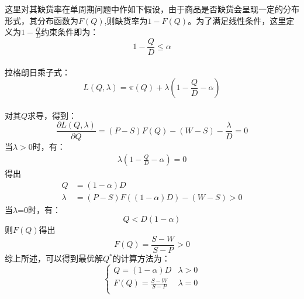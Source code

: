 \documentclass[12pt,a4paper]{article}
\begin{document}
这里对其缺货率在单周期问题中作如下假设，由于商品是否缺货会呈现一定的分布形式，其分布函数为$F\left(Q\right)$,则缺货率为$1-F\left(Q\right)$。为了满足线性条件，这里定义为$1-\frac{Q}{D} $约束条件即为：
\begin{equation}
  1-\frac{Q}{D}\leq \alpha
\end{equation} \\
拉格朗日乘子式：
\begin{equation}
    L\left( Q,\lambda  \right) =\pi \left( Q \right) +\lambda \left( 1-\frac{Q}{D}-\alpha \right)
\end{equation} \\
对其$Q$求导，得到：
\begin{equation}
    \frac{\partial L\left( Q,\lambda  \right)}{\partial Q} =\left( P-S \right) F(Q) -\left( W-S \right) -\frac{\lambda}{D} =0
\end{equation}
当$\lambda >0$时，有：
\begin{align}
    \lambda \left( 1-\frac{Q}{D}-\alpha \right) =0
\end{align}
得出
\begin{align*}
  Q &=\left( 1-\alpha \right) D \\
  \lambda &=\left( P-S \right) F\left( \left( 1-\alpha \right) D \right) -\left( W-S \right)>0
\end{align*}
当$\lambda$=0时，有：
\begin{equation}
    Q<D\left( 1-\alpha \right)
\end{equation}
则$F \left(Q\right)$得出
\begin{equation}
    F\left(Q\right)=\frac{S-W}{S-P} >0
\end{equation}
综上所述，可以得到最优解$Q^*$的计算方法为：
\begin{equation}
    \left\{ \begin{matrix}
        Q =\left( 1-\alpha \right) D &	\lambda >0	\\
        F\left(Q\right)=\frac{S-W}{S-P}  &	\lambda =0	\\
    \end{matrix} \right.
\end{equation}
\end{document}

